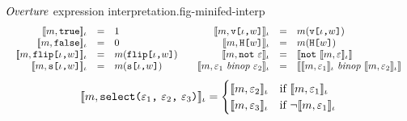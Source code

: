 \begin{fpfig}[t]{$\mathit{Overture}$ expression interpretation.}{fig-minifed-interp}
  {\small
  $$
  \begin{array}{cc}
    \begin{array}{rcl}
      \llbracket m, \texttt{true} \rrbracket_{\iota} &=& 1\\
      \llbracket m, \texttt{false} \rrbracket_{\iota} &=& 0\\
      \llbracket m, \texttt{flip[}\iota\texttt{,}w\texttt{]} \rrbracket_{\iota} &=& m(\texttt{flip[}\iota\texttt{,}w\texttt{]})\\
      \llbracket m, \texttt{s[}\iota\texttt{,}w\texttt{]} \rrbracket_{\iota} &=& m(\texttt{s[}\iota\texttt{,}w\texttt{]})
    \end{array} & 
    \begin{array}{rcl}
      \llbracket m, \texttt{v[}\iota\texttt{,}w\texttt{]} \rrbracket_{\iota} &=& m(\texttt{v[}\iota\texttt{,}w\texttt{]})\\
      \llbracket m, \texttt{H[}w\texttt{]} \rrbracket_{\iota} &=& m(\texttt{H[}w\texttt{]})\\
      \llbracket m, \texttt{not}\ \varepsilon \rrbracket_{\iota} &=& \llbracket \texttt{not}\ \llbracket m,\varepsilon \rrbracket_{\iota} \rrbracket\\
      \llbracket m, \varepsilon_1\ \mathit{binop}\ \varepsilon_2 \rrbracket_{\iota} &=&
      \llbracket \llbracket m,\varepsilon_1 \rrbracket_{\iota}\ \mathit{binop}\ \llbracket m,\varepsilon_2 \rrbracket_{\iota} \rrbracket
    \end{array}
  \end{array}
  $$
  $$
  \lcod{\store, \select{\be_1}{\be_2}{\be_3}}{\cid} =
  \begin{cases}
    \lcod{\store,\be_2}{\cid} & \text{if\ } \lcod{\store,\be_1}{\cid}\\
    \lcod{\store,\be_3}{\cid} & \text{if\ } \neg\lcod{\store,\be_1}{\cid}
  \end{cases}%
  $$
  }
\end{fpfig} 

